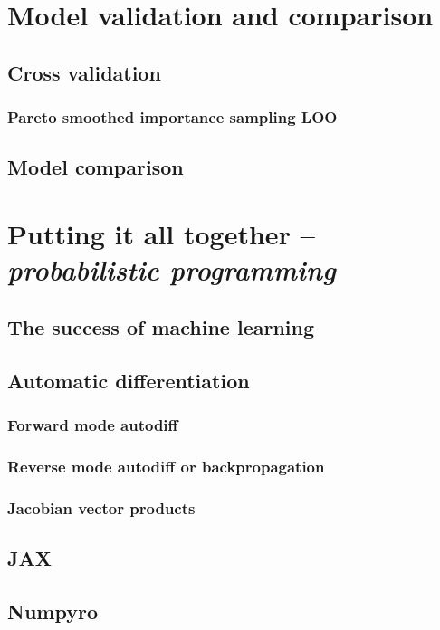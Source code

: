 \documentclass[]{report}
\begin{document}
\section{Model validation and comparison}
\subsection{Cross validation}
\subsubsection{Pareto smoothed importance sampling LOO}
\subsection{Model comparison}

\section{Putting it all together -- \emph{probabilistic programming}}
\subsection{The success of machine learning}
\subsection{Automatic differentiation}
\subsubsection{Forward mode autodiff}
\subsubsection{Reverse mode autodiff or backpropagation}
\subsubsection{Jacobian vector products}
\subsection{JAX}
\subsection{Numpyro}
\end{document}
